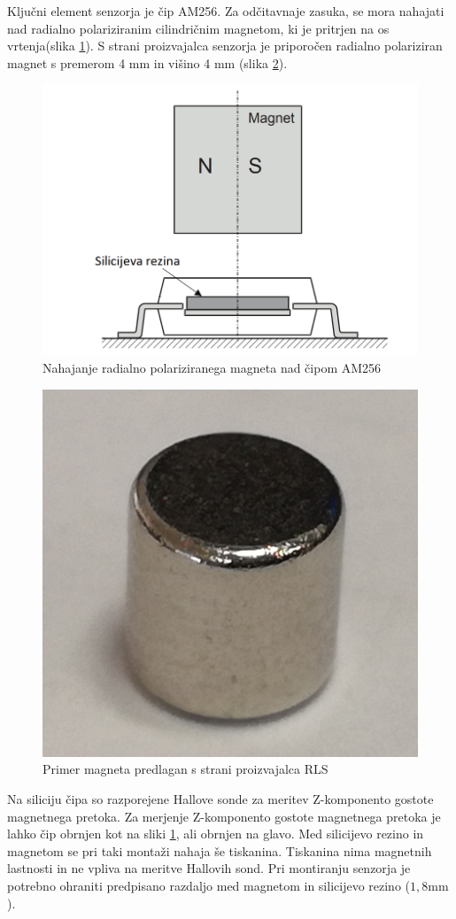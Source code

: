 Ključni element senzorja je čip AM256. Za odčitavnaje zasuka, se mora nahajati nad radialno polariziranim cilindričnim magnetom, ki je pritrjen na os vrtenja(slika \ref{stranski_ris}).
S strani proizvajalca senzorja je priporočen radialno polariziran magnet s premerom 4 mm in višino 4 mm (slika \ref{magnet4mm}).
\begin{figure}[h]
	\centering
	\includegraphics[width=0.5\columnwidth]{./Slike/stranski_ris.png}
	\caption{Nahajanje radialno polariziranega magneta nad čipom AM256 \cite{AM8192}}
	\label{stranski_ris}
\end{figure}
\begin{figure}[h]
	\centering
	\includegraphics[width=0.35\columnwidth]{./Slike/magnet4mm.png}
	\caption{Primer magneta predlagan s strani proizvajalca RLS}
	\label{magnet4mm}
\end{figure}

Na siliciju čipa so razporejene Hallove sonde za meritev Z-komponento gostote magnetnega pretoka. Za merjenje Z-komponento gostote magnetnega pretoka je lahko čip obrnjen kot na sliki \ref{stranski_ris}, ali
obrnjen na glavo. Med silicijevo rezino in magnetom se pri taki montaži nahaja še tiskanina. Tiskanina nima magnetnih lastnosti in ne vpliva na meritve Hallovih sond. Pri montiranju senzorja je potrebno ohraniti predpisano
razdaljo med magnetom in silicijevo rezino ($1,8 \mathrm{mm}$).



